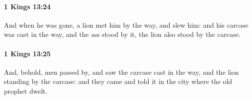		\paragraph{1 Kings 13:24} %
			\label{1KINGS-13-24}

			And when he was gone, a lion met him by the way, and slew him: and his carcase was cast in the way, and the ass stood by it, the lion also stood by the carcase.


		\paragraph{1 Kings 13:25} %
			\label{1KINGS-13-25}

			And, behold, men passed by, and saw the carcase cast in the way, and the lion standing by the carcase: and they came and told it in the city where the old prophet dwelt.


